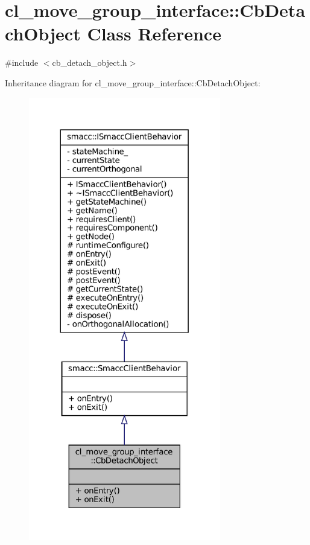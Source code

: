 \hypertarget{classcl__move__group__interface_1_1CbDetachObject}{}\section{cl\+\_\+move\+\_\+group\+\_\+interface\+:\+:Cb\+Detach\+Object Class Reference}
\label{classcl__move__group__interface_1_1CbDetachObject}


{\ttfamily \#include $<$cb\+\_\+detach\+\_\+object.\+h$>$}



Inheritance diagram for cl\+\_\+move\+\_\+group\+\_\+interface\+:\+:Cb\+Detach\+Object\+:
\nopagebreak
\begin{figure}[H]
\begin{center}
\leavevmode
\includegraphics[height=550pt]{classcl__move__group__interface_1_1CbDetachObject__inherit__graph}
\end{center}
\end{figure}


